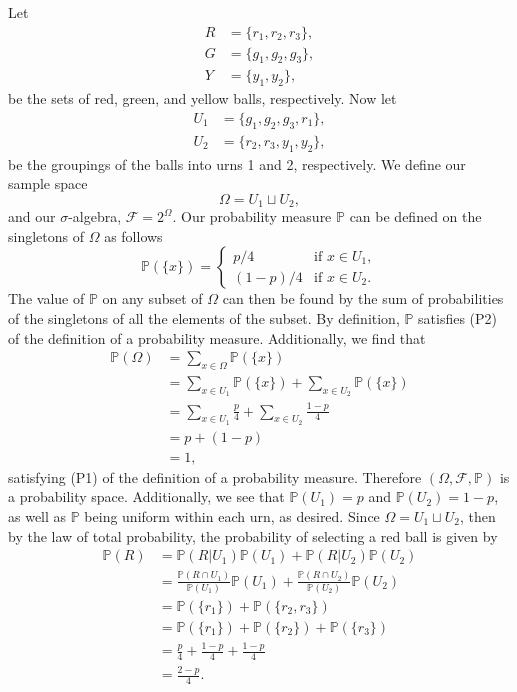 \documentclass[12pt]{article}
\newcommand{\FF}{\mathcal{F}}
\renewcommand{\P}{\mathbb{P}}
\begin{document}
Let 
\begin{align*}
    R &= \{r_1, r_2, r_3\}, \\
    G &= \{g_1, g_2, g_3\}, \\
    Y &= \{y_1, y_2\},
\end{align*}
be the sets of red, green, and yellow balls, respectively. Now let
\begin{align*}
    U_1 &= \{g_1, g_2, g_3, r_1\}, \\
    U_2 &= \{r_2, r_3, y_1, y_2\},
\end{align*}
be the groupings of the balls into urns 1 and 2, respectively. We define our sample space
\[\Omega = U_1\sqcup U_2,\]
and our $\sigma$-algebra, $\FF = 2^\Omega$. Our probability measure $\P$ can be defined on the singletons of $\Omega$ as follows
\[\P(\{x\}) = \begin{cases}
    p/4 &\text{if } x\in U_1, \\
    (1-p)/4 &\text{if } x\in U_2.
\end{cases}\]
The value of $\P$ on any subset of $\Omega$ can then be found by the sum of probabilities of the singletons of all the elements of the subset. By definition, $\P$ satisfies (P2) of the definition of a probability measure. Additionally, we find that
\begin{align*}
    \P(\Omega)
        &= \sum_{x\in\Omega}\P(\{x\})  \\
        &= \sum_{x\in U_1}\P(\{x\}) + \sum_{x\in U_2}\P(\{x\}) \\
        &= \sum_{x\in U_1}\frac{p}4 + \sum_{x\in U_2}\frac{1-p}4 \\
        &= p + (1-p) \\
        &= 1,
\end{align*}
satisfying (P1) of the definition of a probability measure. Therefore $(\Omega, \FF, \P)$ is a probability space. Additionally, we see that $\P(U_1)=p$ and $\P(U_2)=1-p$, as well as $\P$ being uniform within each urn, as desired. Since $\Omega = U_1\sqcup U_2$, then by the law of total probability, the probability of selecting a red ball is given by
\begin{align*}
    \P(R)
        &= \P(R|U_1)\P(U_1) + \P(R|U_2)\P(U_2)  \\[2mm]
        &= \frac{\P(R\cap U_1)}{\P(U_1)}\P(U_1) + \frac{\P(R\cap U_2)}{\P(U_2)}\P(U_2) \\[2mm]
        &= \P(\{r_1\}) + \P(\{r_2,r_3\}) \\[2mm]
        &= \P(\{r_1\}) + \P(\{r_2\}) + \P(\{r_3\}) \\
        &= \frac{p}4 + \frac{1-p}4 + \frac{1-p}4 \\
        &= \frac{2-p}4.
\end{align*}
\end{document}
